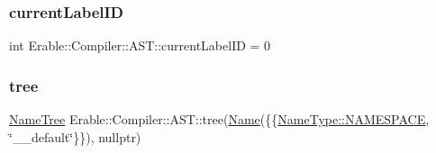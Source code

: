 \mbox{\label{namespace_erable_1_1_compiler_1_1_a_s_t_ad5d7d4540a5f5eef77dfd6056081eec6}} 
\subsubsection{\texorpdfstring{currentLabelID}{currentLabelID}}
{\footnotesize\ttfamily int Erable\+::\+Compiler\+::\+A\+S\+T\+::current\+Label\+ID = 0\hspace{0.3cm}{\ttfamily [inline]}}

\mbox{\label{namespace_erable_1_1_compiler_1_1_a_s_t_a88afc6fd33b444e170c4ede257ce1b5d}} 
\subsubsection{\texorpdfstring{tree}{tree}}
{\footnotesize\ttfamily \mbox{\hyperlink{class_erable_1_1_compiler_1_1_a_s_t_1_1_name_tree}{Name\+Tree}} Erable\+::\+Compiler\+::\+A\+S\+T\+::tree(\mbox{\hyperlink{class_erable_1_1_compiler_1_1_a_s_t_1_1_name}{Name}}(\{\{\mbox{\hyperlink{namespace_erable_1_1_compiler_1_1_a_s_t_a9359137137aacfee07e935a0ae706a84a7347fe5a0f184f79ef064e92e3beb297}{Name\+Type\+::\+N\+A\+M\+E\+S\+P\+A\+CE}}, \char`\"{}\+\_\+\+\_\+default\char`\"{}\}\}), nullptr)\hspace{0.3cm}{\ttfamily [inline]}}

